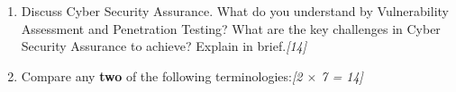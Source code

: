 \documentclass[11pt,a4paper]{article}
\newcommand{\pts}[1]{\hfill \textit{[#1]}}
\begin{document}
\begin{enumerate}[label=\textbf{\arabic*.},leftmargin=*,itemsep=12pt]
  \item Discuss Cyber Security Assurance. What do you understand by Vulnerability Assessment and Penetration Testing? What are the key challenges in Cyber Security Assurance to achieve? Explain in brief.\pts{14}

  \item Compare any \textbf{two} of the following terminologies:\pts{2 $\times$ 7 = 14}

\end{enumerate}
\end{document}
